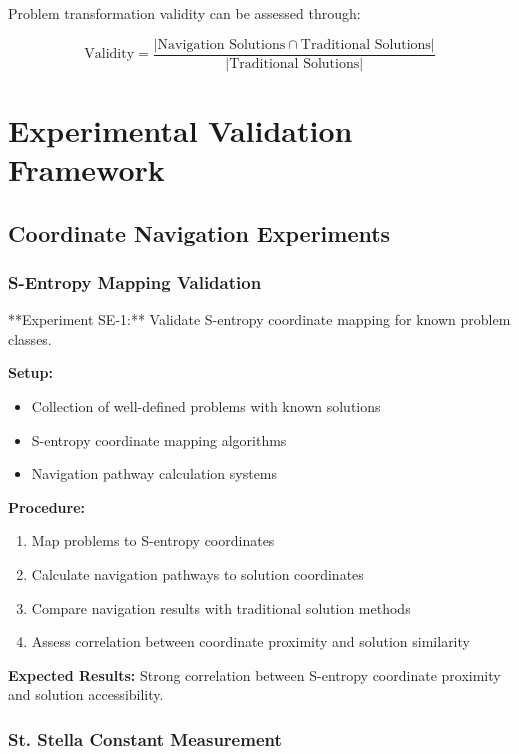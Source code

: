 \documentclass[11pt]{article}
\begin{document}
Problem transformation validity can be assessed through:

\begin{equation}
\text{Validity} = \frac{|\text{Navigation Solutions} \cap \text{Traditional Solutions}|}{|\text{Traditional Solutions}|}
\label{eq:transformation_validity}
\end{equation}

\section{Experimental Validation Framework}

\subsection{Coordinate Navigation Experiments}

\subsubsection{S-Entropy Mapping Validation}

**Experiment SE-1:** Validate S-entropy coordinate mapping for known problem classes.

\textbf{Setup:}
\begin{itemize}
\item Collection of well-defined problems with known solutions
\item S-entropy coordinate mapping algorithms
\item Navigation pathway calculation systems
\end{itemize}

\textbf{Procedure:}
\begin{enumerate}
\item Map problems to S-entropy coordinates
\item Calculate navigation pathways to solution coordinates
\item Compare navigation results with traditional solution methods
\item Assess correlation between coordinate proximity and solution similarity
\end{enumerate}

\textbf{Expected Results:} Strong correlation between S-entropy coordinate proximity and solution accessibility.

\subsubsection{St. Stella Constant Measurement}
\end{document}
